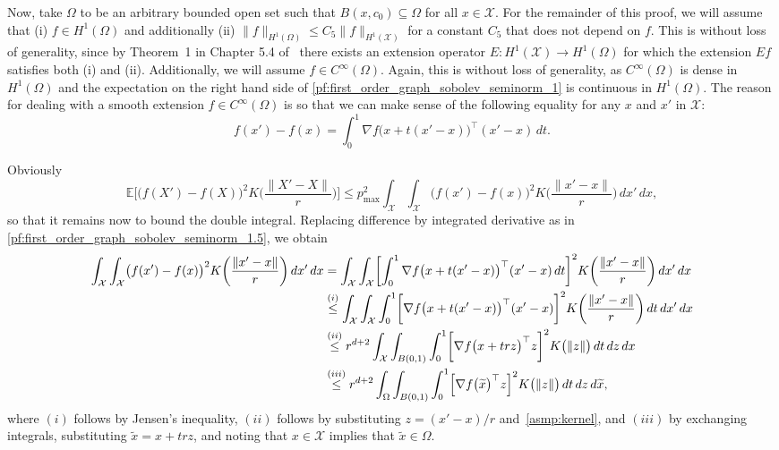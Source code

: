 \documentclass[twoside]{article}
\newcommand{\1}{\mathbf{1}}
\newcommand{\Xset}{\mathcal{X}}
\newcommand{\mc}[1]{\mathcal{#1}}
\newcommand{\Ebb}{\mathbb{E}}
\newcommand{\wt}[1]{\widetilde{#1}}
\theoremstyle{definition}
\theoremstyle{remark}
\begin{document}
Now, take $\Omega$ to be an arbitrary bounded open set such that $B(x,c_0) \subseteq \Omega$ for all $x \in \mc{X}$. For the remainder of this proof, we will assume that (i) $f \in H^1(\Omega)$ and additionally (ii) $\|f\|_{H^1(\Omega)} \leq C_5 \|f\|_{H^1(\mc{X})}$ for a constant $C_5$ that does not depend on $f$. This is without loss of generality, since by Theorem~1 in Chapter 5.4 of~\citet{evans10} there exists an extension operator $E: H^1(\mc{X}) \to H^1(\Omega)$ for which the extension $Ef$ satisfies both (i) and (ii). Additionally, we will assume $f \in C^{\infty}(\Omega)$. Again, this is without loss of generality, as $C^{\infty}(\Omega)$ is dense in $H^1(\Omega)$ and the expectation on the right hand side of \eqref{pf:first_order_graph_sobolev_seminorm_1} is continuous in $H^1(\Omega)$. The reason for dealing with a smooth extension $f \in C^{\infty}(\Omega)$ is so that we can make sense of the following equality for any $x$ and $x'$ in $\mc{X}$:
\begin{equation}
\label{pf:first_order_graph_sobolev_seminorm_1.5}
f(x') - f(x) = \int_{0}^{1} \nabla f\bigl(x + t(x' - x)\bigr)^{\top} (x' - x) \,dt.
\end{equation}

Obviously
\begin{equation}
\Ebb\biggl[\bigl(f(X') - f(X)\bigr)^2K\biggl(\frac{\|X' - X\|}{r}\biggr)\biggr] \leq p_{\max}^2 \int_{\Xset} \int_{\Xset} \bigl(f(x') - f(x)\bigr)^2 K\biggl(\frac{\|x' - x\|}{r}\biggr) \,dx' \,dx, \label{pf:first_order_graph_sobolev_seminorm_2}
\end{equation}
so that it remains now to bound the double integral. Replacing difference by integrated derivative as in \eqref{pf:first_order_graph_sobolev_seminorm_1.5}, we obtain
\begin{align}
\int_{\Xset} \int_{\Xset} \bigl(f(x') - f(x)\bigr)^2 K\biggl(\frac{\|x' - x\|}{r}\biggr) \,dx' \,dx & = \int_{\Xset} \int_{\Xset} \biggl[\int_{0}^{1} \nabla f\bigl(x + t(x' - x)\bigr)^{\top} (x' - x)\,dt\biggr]^2 K\biggl(\frac{\|x' - x\|}{r}\biggr) \,dx' \,dx \nonumber \\
& \overset{(i)}{\leq} \int_{\Xset} \int_{\Xset} \int_{0}^{1} \biggl[\nabla f\bigl(x + t(x' - x)\bigr)^{\top} (x' - x)\biggr]^2 K\biggl(\frac{\|x' - x\|}{r}\biggr) \,dt\,dx' \,dx \nonumber \\
& \overset{(ii)}{\leq} r^{d + 2} \int_{\Xset} \int_{B(0,1)} \int_{0}^{1} \biggl[\nabla f\bigl(x + trz\bigr)^{\top} z\biggr]^2 K\bigl(\|z\|\bigr) \,dt\,dz \,dx \nonumber \\
&  \overset{(iii)}{\leq} r^{d + 2} \int_{\Omega} \int_{B(0,1)} \int_{0}^{1} \Bigl[\nabla f\bigl(\wt{x}\bigr)^{\top} z\Bigr]^2 K\bigl(\|z\|\bigr) \,dt \,dz \,d\wt{x}, \label{pf:first_order_graph_sobolev_seminorm_3} 
\end{align}
where $(i)$ follows by Jensen's inequality, $(ii)$ follows by substituting $z = (x' - x)/r$ and~\ref{asmp:kernel}, and $(iii)$ by exchanging integrals, substituting $\wt{x} = x + trz$, and noting that $x \in \mc{X}$ implies that $\wt{x} \in \Omega$.
\end{document}
